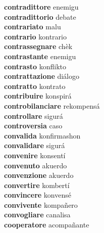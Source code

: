 \textbf{contradittore } enemigu \\
\textbf{contradittorio } debate \\
\textbf{contrariato } malu \\
\textbf{contrario } kontrario \\
\textbf{contrassegnare } chèk \\
\textbf{contrastante } enemigu \\
\textbf{contrasto } konflikto \\
\textbf{contrattazione } diálogo \\
\textbf{contratto } kontrato \\
\textbf{contribuire } konspirá \\
\textbf{controbilanciare } rekompensá \\
\textbf{controllare } sigurá \\
\textbf{controversia } caso \\
\textbf{convalida } konfirmashon \\
\textbf{convalidare } sigurá \\
\textbf{convenire } konsentí \\
\textbf{convenuto } akuerdo \\
\textbf{convenzione } akuerdo \\
\textbf{convertire } kombertí \\
\textbf{convincere } konvensé \\
\textbf{convivente } kompañero \\
\textbf{convogliare } canalisa \\
\textbf{cooperatore } acompañante \\
